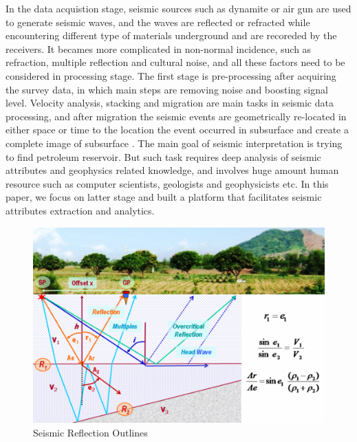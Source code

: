 In the data acquistion stage, seismic sources such as dynamite or air gun are used to generate seismic waves, and the waves are reflected or refracted while encountering different type of materials underground and are recoreded by the receivers. It becames more complicated in non-normal incidence, such as refraction, multiple reflection and cultural noise, and all these factors need to be considered in processing stage. The first stage is pre-processing after acquiring the survey data, in which main steps are removing noise and boosting signal level. Velocity analysis, stacking and migration are main tasks in seismic data processing, and after migration the seismic events are geometrically re-located in either space or time to the location the event occurred in subsurface and create a complete image of subsurface \cite{seisreflection}. The main goal of seismic interpretation is trying to find petroleum reservoir. But such task requires deep analysis of seismic attributes and geophysics related knowledge, and involves huge amount human resource such as computer scientists, geologists and geophysicists etc. In this paper, we focus on latter stage and built a platform that facilitates seismic attributes extraction and analytics.   

\begin{figure}[h]
\centering
\includegraphics[scale=1]{figures/seismic_reflection_principal.png}
\caption{Seismic Reflection Outlines \cite{seisreflection}}
\label{seismic_reflection}
\end{figure}



